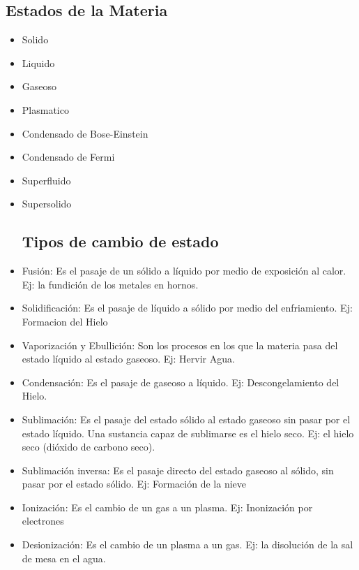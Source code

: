 \documentclass[11pt]{article}
\begin{document}
\subsection{Estados de la Materia}
\begin{itemize} 
  \item Solido 

  \item Liquido

  \item Gaseoso 

  \item Plasmatico
    
  \item Condensado de Bose-Einstein
    
  \item Condensado de Fermi

  \item Superfluido
  
  \item Supersolido 
  
  \subsection{Tipos de cambio de estado}
  
  \item Fusión: Es el pasaje de un sólido a líquido por medio de exposición al calor. Ej: la fundición de los metales en hornos.
  \item  Solidificación: Es el pasaje de líquido a sólido por medio del enfriamiento. Ej: Formacion del Hielo
  \item  Vaporización y Ebullición: Son los procesos en los que la materia pasa del estado líquido al estado gaseoso. Ej: Hervir Agua.
  \item  Condensación: Es el pasaje de gaseoso a líquido. Ej: Descongelamiento del Hielo.
  \item Sublimación: Es el pasaje del estado sólido al estado gaseoso sin pasar por el estado líquido. Una sustancia capaz de sublimarse es el hielo seco. Ej: el hielo seco (dióxido de carbono seco).
  \item  Sublimación inversa: Es el pasaje directo del estado gaseoso al sólido, sin pasar por el estado sólido. Ej: Formación de la nieve 
  \item  Ionización: Es el cambio de un gas a un plasma. Ej: Inonización por electrones
  \item  Desionización: Es el cambio de un plasma a un gas. Ej: la disolución de la sal de mesa en el agua.
\end{itemize}
\end{document}
